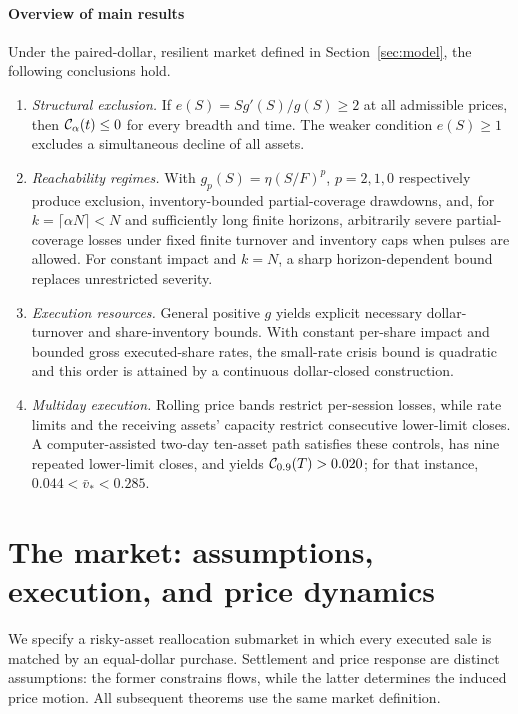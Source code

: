 \documentclass[review,hidelinks,onefignum,onetabnum]{siamonline250211}
\begin{document}
\paragraph{Overview of main results}
Under the paired-dollar, resilient market defined in Section~\ref{sec:model}, the following conclusions hold.
\begin{enumerate}[label=\textup{(\roman*)},leftmargin=2em,itemsep=0.12em]
\item \emph{Structural exclusion.} If $e(S)=Sg'(S)/g(S)\ge2$ at all admissible prices, then $\mathcal{C}_\alpha(t)\le0$ for every breadth and time. The weaker condition $e(S)\ge1$ excludes a simultaneous decline of all assets.
\item \emph{Reachability regimes.} With $g_p(S)=\eta(S/F)^p$, $p=2,1,0$ respectively produce exclusion, inventory-bounded partial-coverage drawdowns, and, for $k=\lceil\alpha N\rceil<N$ and sufficiently long finite horizons, arbitrarily severe partial-coverage losses under fixed finite turnover and inventory caps when pulses are allowed. For constant impact and $k=N$, a sharp horizon-dependent bound replaces unrestricted severity.
\item \emph{Execution resources.} General positive $g$ yields explicit necessary dollar-turnover and share-inventory bounds. With constant per-share impact and bounded gross executed-share rates, the small-rate crisis bound is quadratic and this order is attained by a continuous dollar-closed construction.
\item \emph{Multiday execution.} Rolling price bands restrict per-session losses, while rate limits and the receiving assets' capacity restrict consecutive lower-limit closes. A computer-assisted two-day ten-asset path satisfies these controls, has nine repeated lower-limit closes, and yields $\mathcal{C}_{0.9}(T)>0.020$; for that instance, $0.044<\bar v_*<0.285$.
\end{enumerate}


\section{The market: assumptions, execution, and price dynamics}\label{sec:micro}\label{sec:model}
We specify a risky-asset reallocation submarket in which every executed sale is matched by an equal-dollar purchase. Settlement and price response are distinct assumptions: the former constrains flows, while the latter determines the induced price motion. All subsequent theorems use the same market definition.
\end{document}
